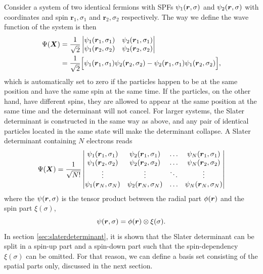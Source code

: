 Consider a system of two identical fermions with SPFs $\psi_1(\boldsymbol{{r}},\sigma)$ and $\psi_2(\boldsymbol{{r}},\sigma)$ with coordinates and spin $\boldsymbol{r}_1,\sigma_1$ and $\boldsymbol{r}_2,\sigma_2$ respectively. The way we define the wave function of the system is then
\begin{equation}
\begin{aligned}
\Psi(\boldsymbol{{X}})&=\frac{1}{\sqrt{2}}
\begin{vmatrix}
\psi_1(\boldsymbol{r}_1,\sigma_1) & \psi_2(\boldsymbol{r}_1,\sigma_1)\\
\psi_1(\boldsymbol{r}_2,\sigma_2) & \psi_2(\boldsymbol{r}_2,\sigma_2)
\end{vmatrix}\\
&=\frac{1}{\sqrt{2}}\Big[\psi_1(\boldsymbol{r}_1,\sigma_1)\psi_2(\boldsymbol{r}_2,\sigma_2)-\psi_2(\boldsymbol{r}_1,\sigma_1)\psi_1(\boldsymbol{r}_2,\sigma_2)\Big],
\end{aligned}
\end{equation}
which is automatically set to zero if the particles happen to be at the same position and have the same spin at the same time. If the particles, on the other hand, have different spins, they are allowed to appear at the same position at the same time and the determinant will not cancel. For larger systems, the Slater determinant is constructed in the same way as above, and any pair of identical particles located in the same state will make the determinant collapse. A Slater determinant containing $N$ electrons reads
\begin{equation}
\Psi(\boldsymbol{{X}})=\frac{1}{\sqrt{N!}}
\begin{vmatrix}
\psi_1(\boldsymbol{r}_1,\sigma_1) & \psi_2(\boldsymbol{r}_1,\sigma_1) & \hdots & \psi_N(\boldsymbol{r}_1,\sigma_1)\\
\psi_1(\boldsymbol{r}_2,\sigma_2) & \psi_2(\boldsymbol{r}_2,\sigma_2) & \hdots & \psi_N(\boldsymbol{r}_2,\sigma_2)\\
\vdots & \vdots & \ddots & \vdots \\
\psi_1(\boldsymbol{r}_N,\sigma_N) & \psi_2(\boldsymbol{r}_N,\sigma_N) & \hdots & \psi_N(\boldsymbol{r}_N,\sigma_N)
\end{vmatrix}
\end{equation}
where the $\psi(\boldsymbol{{r}},\sigma)$ is the tensor product between the radial part $\phi(\boldsymbol{{r}})$ and the spin part $\xi(\sigma)$,
\begin{equation}
\psi(\boldsymbol{{r}},\sigma)=\phi(\boldsymbol{{r}})\otimes\xi(\sigma).
\end{equation}
In section \ref{sec:slaterdeterminant}, it is shown that the Slater determinant can be split in a spin-up part and a spin-down part such that the spin-dependency $\xi(\sigma)$ can be omitted. For that reason, we can define a basis set consisting of the spatial parts only, discussed in the next section. 

